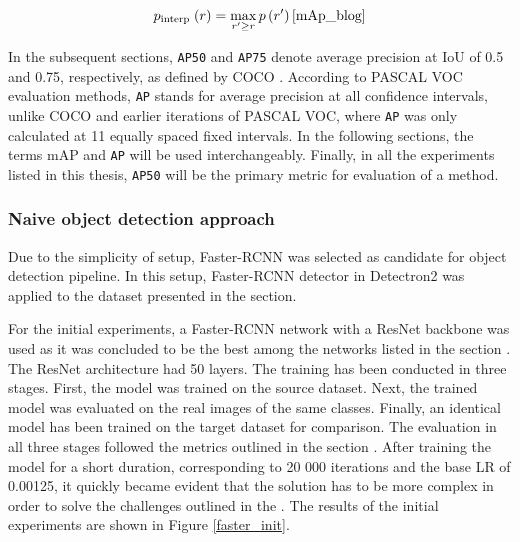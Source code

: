 \begin{equation}
p_{\text {interp }}(r)=\max _{r^{\prime} \geq r} p\left(r^{\prime}\right)
\label{interp}
\cite{mAp_blog}  
\end{equation}

In the subsequent sections, \texttt{AP50} and \texttt{AP75} denote average precision at IoU of 0.5 and 0.75, respectively, as defined by COCO \cite{Lin2014}. According to PASCAL VOC \cite{Everingham10} evaluation methods, \texttt{AP} stands for average precision at all confidence intervals, unlike COCO \cite{Lin2014} and earlier iterations of PASCAL VOC, where \texttt{AP} was only calculated at 11 equally spaced fixed intervals. In the following sections, the terms mAP and \texttt{AP} will be used interchangeably. Finally, in all the experiments listed in this thesis, \texttt{AP50} will be the primary metric for evaluation of a method.  


\subsubsection{Naive object detection approach}
\label{naive} 
Due to the simplicity of setup, Faster-RCNN \cite{ima} was selected as  candidate for object detection pipeline. In this setup, Faster-RCNN detector in Detectron2  \cite{wu2019Detectron2} was applied to the dataset presented in the  section. 

For the initial experiments, a Faster-RCNN network with a ResNet backbone was used as it was concluded to be the best among the networks listed in the section . The ResNet architecture had 50 layers. The training has been conducted in three stages. First, the model was trained on the source dataset. Next, the trained model was evaluated on the real images of the same classes. Finally, an identical model has been trained on the target dataset for comparison. The evaluation in all three stages followed the metrics outlined in the section . After training the model for a short duration, corresponding to 20 000 iterations and the base LR of 0.00125, it quickly became evident that the solution has to be more complex in order to solve the challenges outlined in the . The results of the initial experiments are shown in Figure \ref{faster_init}.


